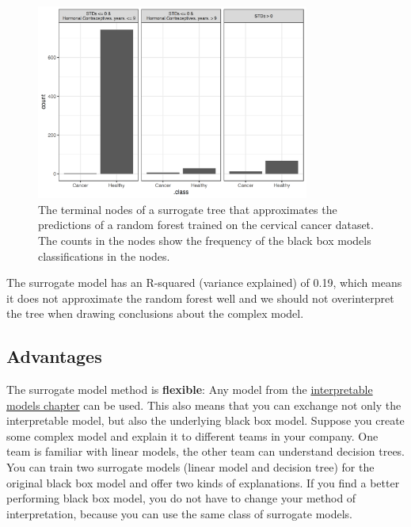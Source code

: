 \documentclass[
  11pt,
]{scrbook}
\begin{document}
\begin{figure}

{\centering \includegraphics[width=0.8\textwidth]{images/surrogate-cervical-1} 

}

\caption{The terminal nodes of a surrogate tree that approximates the predictions of a random forest trained on the cervical cancer dataset. The counts in the nodes show the frequency of the black box models classifications in the nodes.}\label{fig:surrogate-cervical}
\end{figure}

The surrogate model has an R-squared (variance explained) of 0.19, which means it does not approximate the random forest well and we should not overinterpret the tree when drawing conclusions about the complex model.

\hypertarget{advantages-10}{%
\subsection{Advantages}\label{advantages-10}}

The surrogate model method is \textbf{flexible}:
Any model from the \protect\hyperlink{simple}{interpretable models chapter} can be used.
This also means that you can exchange not only the interpretable model, but also the underlying black box model.
Suppose you create some complex model and explain it to different teams in your company.
One team is familiar with linear models, the other team can understand decision trees.
You can train two surrogate models (linear model and decision tree) for the original black box model and offer two kinds of explanations.
If you find a better performing black box model, you do not have to change your method of interpretation, because you can use the same class of surrogate models.
\end{document}
